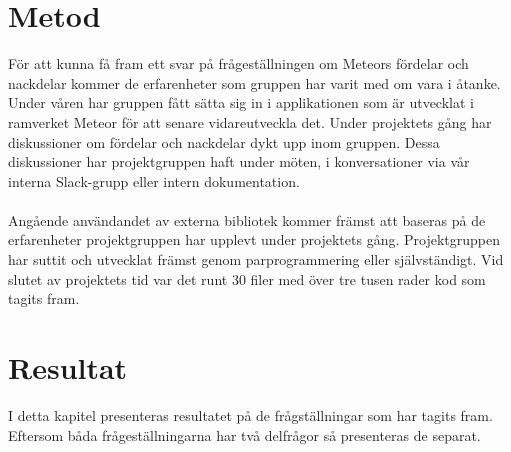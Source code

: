 \section{Metod}
\label{sec:johan_t-metod}
För att kunna få fram ett svar på frågeställningen om Meteors fördelar och nackdelar kommer de erfarenheter som gruppen har varit med om vara i åtanke. Under våren har gruppen fått sätta sig in i applikationen som är utvecklat i ramverket Meteor för att senare vidareutveckla det. Under projektets gång har diskussioner om fördelar och nackdelar dykt upp inom gruppen. Dessa diskussioner har projektgruppen haft under möten, i konversationer via vår interna Slack-grupp eller intern dokumentation. 
\\ \\
Angående användandet av externa bibliotek kommer främst att baseras på de erfarenheter projektgruppen har upplevt under projektets gång. Projektgruppen har suttit och utvecklat främst genom parprogrammering eller självständigt. Vid slutet av projektets tid var det runt 30 filer med över tre tusen rader kod som tagits fram.
\section{Resultat}
\label{sec:johan_t-resultat}
I detta kapitel presenteras resultatet på de frågställningar som har tagits fram. Eftersom båda frågeställningarna har två delfrågor så presenteras de separat. 
